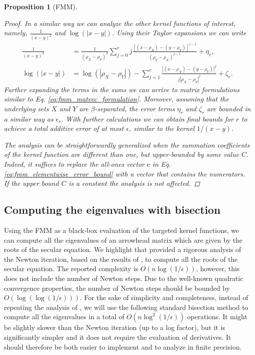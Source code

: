 \documentclass{article}
\newtheorem{proposition}{Proposition}[section]
\newcommand\vece{\boldsymbol{\mathrm{e}}}
\begin{document}
\begin{proposition}[FMM]
\begin{proof}
    In a similar way we can analyze the other kernel functions of interest, namely, $\frac{1}{(x-y)^2}$ and $\log(|x-y|)$. Using their Taylor expansions we can write
    \begin{align*}
        \frac{1}{(x-y)^2} &= \frac{1}{(\rho_X-\rho_Y)^2}\sum_{j=0}^rj\frac{[(x-\rho_X)-(y-\rho_Y)]^{j-1}}{(\rho_Y-\rho_X)^{j-1}}+ \eta_r,
        \\
        \log(|x-y|) &= \log(|\rho_X-\rho_Y|)-\sum_{j=1}^r\frac{|(x-\rho_X)-(y-\rho_Y)|^j}{j|\rho_X-\rho_Y|^j} + \zeta_r.
    \end{align*}
    Further expanding the terms in the sums we can arrive to matrix formulations similar to Eq. \eqref{eq:fmm_matvec_formulation}. Moreover, assuming that the underlying sets $X$ and $Y$ are $\beta$-separated, the error terms $\eta_r$ and $\zeta_r$ are bounded in a similar way as $\epsilon_r$. 
    With further calculations we can obtain final bounds for $r$ to achieve a total additive error of at most $\epsilon$, similar to the kernel $1/(x-y)$.
    
    The analysis can be straightforwardly generalized when the summation coefficients of the kernel function are different than one, but  upper-bounded by some value $C$. Indeed, it suffices to replace the all-ones vector $\vece$ in Eq. \eqref{eq:fmm_elementwise_error_bound} with a vector that contains the numerators. If the upper bound $C$ is a constant the analysis is not affected.
\end{proof}
\end{proposition}













\subsection{Computing the eigenvalues with bisection}

Using the FMM as a black-box evaluation of the targeted kernel functions, we can compute all the eigenvalues of an arrowhead matrix which are given by the roots of the secular equation.
We highlight that \cite{livne2002n} provided a rigorous analysis of the Newton iteration, based on the results of \cite{melman1995numerical}, to compute all the roots of the secular equation. The reported complexity is $O(n\log(1/\epsilon))$, however, this does not include the number of Newton steps. Due to the well-known quadratic convergence properties, the number of Newton steps should be bounded by $O(\log(\log(1/\epsilon)))$. For the sake of simplicity and completeness, instead of repeating the analysis of \cite{livne2002n}, we will use the following standard bisection method to compute all the eigenvalues in a total of $O(n\log^2(1/\epsilon))$ operations. It might be slightly slower than the Newton iteration (up to a log factor), but it is significantly simpler and it does not require the evaluation of derivatives. It should therefore be both easier to implement and to analyze in finite precision. 
\end{document}
